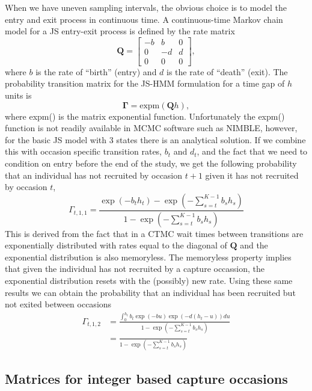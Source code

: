 \documentclass[12pt]{article}
\newcommand{\bG}{\ensuremath{\boldsymbol{\Gamma}}}
\begin{document}
When we have uneven sampling intervals, the obvious choice is to model the entry and exit process in continuous time. A continuous-time Markov chain model for a JS entry-exit process is defined by the rate matrix 
\[
\mathbf{Q} = \left[
\begin{array}{ccc}
-b & b & 0 \\ 
0 & -d & d \\
0 & 0 & 0
\end{array}
\right],
\]
where $b$ is the rate of ``birth'' (entry) and $d$ is the rate of ``death'' (exit). The probability transition matrix for the JS-HMM formulation for a time gap of $h$ units is
\[
\bG = \text{expm}(\mathbf{Q}h),
\]
where expm() is the matrix exponential function. Unfortunately the expm() function is not readily available in MCMC software such as NIMBLE, however, for the basic JS model with 3 states there is an analytical solution. If we combine this with occasion specific transition rates, $b_t$ and $d_t$, and the fact that we need to condition on entry before the end of the study, we get the following probability that an individual has not recruited by occasion $t+1$ given it has not recruited by occasion $t$,
\[
\Gamma_{t,1,1} = \frac{\exp(-b_th_t) - \exp(-\sum_{s=t}^{K-1} b_s h_s)}{1-\exp(-\sum_{s=t}^{K-1} b_s h_s)}
\]
This is derived from the fact that in a CTMC wait times between transitions are exponentially distributed with rates equal to the diagonal of $\mathbf{Q}$ and the exponential distribution is also memoryless. The memoryless property implies that given the individual has not recruited by a capture occassion, the exponential distribution resets with the (possibly) new rate. Using these same results we can obtain the probability that an individual has been recruited but not exited between occasions
\[
\begin{aligned}
\Gamma_{t,1,2} &= \frac{\int_0^{h_t} b_t\exp(-bu)\exp(-d(h_t-u))du}{1-\exp(-\sum_{s=t}^{K-1} b_s h_s)} \\
&= \frac{}{1-\exp(-\sum_{s=t}^{K-1} b_s h_s)}
\end{aligned}
\]

\subsection{Matrices for integer based capture occasions}
\end{document}
